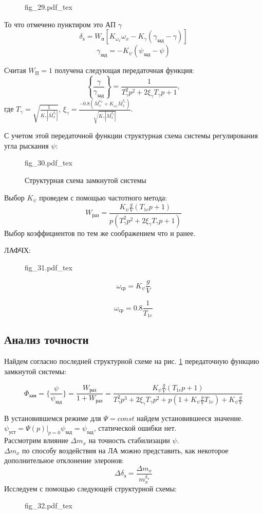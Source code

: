 \documentclass{article}
\begin{document}
\begin{figure}[H]
	\centering
	{fig_29.pdf_tex}
\end{figure}

То что отмечено пунктиром это АП $\gamma$
\[
	\delta_\text{э} = W_\text{п}[K_{\omega_x}\omega_x -
		K_{\gamma}(\gamma_\text{зад} - \gamma)]
\]
\[
	\gamma_\text{зад} = -K_{\psi}(\psi_\text{зад} - \psi)
\]

Считая $W_\text{П} = 1$ получена следующая передаточная функция:
\[
	\left\{\frac{\gamma}{\gamma_\text{зад}} \right\}=\frac{1}{T_{\gamma}^2 p^2 + 2
		\xi_{\gamma} T_\gamma p + 1},
\]
где $T_{\gamma} = \sqrt{\frac{1}{K_{\gamma}|\bar{M}_x^{\delta_\text{э}}|}}$,
$\xi_{\gamma} =\frac{-0.8(\bar{M}_x^{\omega_x} + K_{\omega_x}
	\bar{M}_x^{\delta_\text{э}})}{\sqrt{K_\gamma |\bar{M}_x^{\delta_\text{э}}|}}$.

С учетом этой передаточной функции структурная схема системы регулирования угла
рыскания $\psi$:

\begin{figure}[h]
	\centering
	{fig_30.pdf_tex}
	\caption{Структурная схема замкнутой системы}
	\label{fig:zam30}
\end{figure}

Выбор $K_{\psi}$ проведем с помощью частотного метода:
\[
	W_\text{раз} = \frac{K_{\psi} \frac{g}{V} (T_{1c}p + 1)}{p(T_{\gamma}^2 p^2
		+ 2 \xi_\gamma T_\gamma p + 1)}
\]
Выбор коэффициентов по тем же соображением что и ранее.


ЛАФЧХ:
\begin{figure}[H]
	\centering
	{fig_31.pdf_tex}
\end{figure}

\[
	\omega_\text{ср} = K_{\psi}\frac{g}{V}
\]

\[
	\omega_\text{ср} = 0.8\frac{1}{T_{1c}}
\]

\subsection{Анализ точности}
Найдем согласно последней структурной схеме на рис. \ref{fig:zam30}
передаточную функцию замкнутой системы:

\[
	\Phi_\text{зам} = \{\frac{\psi}{\psi_\text{зад}} \} = \frac{W_\text{раз}}{1
		+ W_\text{раз}} = \frac{K_{\psi}\frac{g}{V}(T_{1c}p + 1)}{T_{\gamma}^2 p^3
		+ 2\xi_\gamma T_\gamma p^2 + p(1 + K_{\psi}\frac{g}{V} T_{1c}) +
		K_{\psi}\frac{g}{V}}
\]

В установившемся режиме для $\Psi = const$ найдем установившееся значение.\\
$\psi_\text{уст} = \Psi(p) |_{p=0}  \psi _\text{зад}= \psi_\text{зад}$,
статической ошибки нет.\\
Рассмотрим влияние $\Delta m_x$ на точность стабилизации $\psi$.\\
$\Delta m_x$ по способу воздействия на ЛА можно представить, как некоторое
дополнительное отклонение элеронов:
\[
	\Delta \delta_\text{э} =\frac{\Delta m_x}{m_x^{\delta_\text{э}}}
\]
Исследуем с помощью следующей структурной схемы:
\begin{figure}[H]
	\centering
	{fig_32.pdf_tex}
\end{figure}
\end{document}
